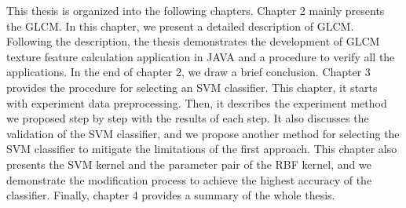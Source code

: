 This thesis is organized into the following chapters. Chapter 2 mainly presents the GLCM. In this chapter, we present a detailed description of GLCM. Following the description, the thesis demonstrates the development of GLCM texture feature calculation application in JAVA and a procedure to verify all the applications. In the end of chapter 2, we draw a brief conclusion. Chapter 3 provides the procedure for selecting an SVM classifier. This chapter, it starts with experiment data preprocessing. Then, it describes the experiment method we proposed step by step with the results of each step. It also discusses the validation of the SVM classifier, and we propose another method for selecting the SVM classifier to mitigate the limitations of the first approach. This chapter also presents the SVM kernel and the parameter pair of the RBF kernel, and we demonstrate the modification process to achieve the highest accuracy of the classifier. Finally, chapter 4 provides a summary of the whole thesis.      